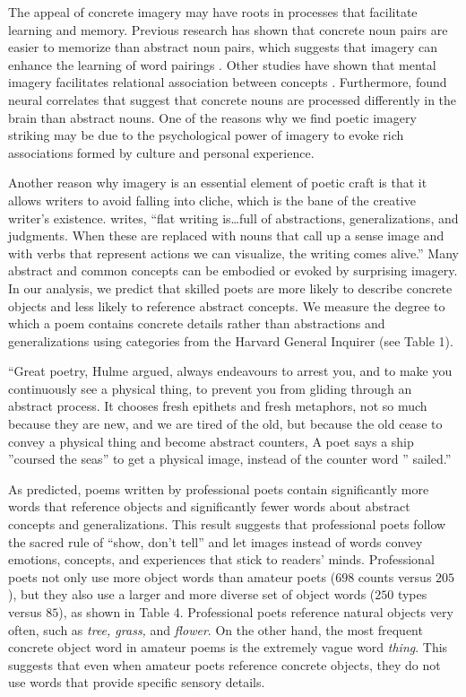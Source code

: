 \documentclass{book}
\begin{document}
The appeal of concrete imagery may have roots in processes that facilitate learning and memory. Previous research has shown that concrete noun pairs are easier to memorize than abstract noun pairs, which suggests that imagery can enhance the learning of word pairings \citep{pairing}. Other studies have shown that mental imagery facilitates relational association between concepts \citep{imagery}. Furthermore, \cite{neuro} found neural correlates that suggest that concrete nouns are processed differently in the brain than abstract nouns. One of the reasons why we find poetic imagery striking may be due to the psychological power of imagery to evoke rich associations formed by culture and personal experience. 

Another reason why imagery is an essential element of poetic craft is that it allows writers to avoid falling into cliche, which is the bane of the creative writer's existence. \cite{Burroway} writes, ``flat writing is\dots full of abstractions, generalizations, and judgments. When these are replaced with nouns that call up a sense image and with verbs that represent actions we can visualize, the writing comes alive.'' Many abstract and common concepts can be embodied or evoked by surprising imagery. In our analysis, we predict that skilled poets are more likely to describe concrete objects and less likely to reference abstract concepts. We measure the degree to which a poem contains concrete details rather than abstractions and generalizations using categories from the Harvard General Inquirer (see Table 1). 

``Great poetry, Hulme argued, always endeavours to arrest you, and to make you continuously see a physical thing, to prevent you from gliding through an abstract process. It chooses fresh epithets and fresh metaphors, not so much because they are new, and we are tired of the old, but because the old cease to convey a physical thing and become abstract counters, A poet says a ship ''coursed the seas'' to get a physical image, instead of the counter word '' sailed.'' 

As predicted, poems written by professional poets contain significantly more words that reference objects and significantly fewer words about abstract concepts and generalizations. This result suggests that professional poets follow the sacred rule of ``show, don't tell'' and let images instead of words convey emotions, concepts, and experiences that stick to readers' minds. Professional poets not only use more object words than amateur poets ($698$ counts versus $205$), but they also use a larger and more diverse set of object words ($250$ types versus $85$), as shown in Table 4. Professional poets reference natural objects very often, such as \emph{tree, grass,} and \emph{flower}. On the other hand, the most frequent concrete object word in amateur poems is the extremely vague word \emph{thing}. This suggests that even when amateur poets reference concrete objects, they do not use words that provide specific sensory details.
\end{document}
